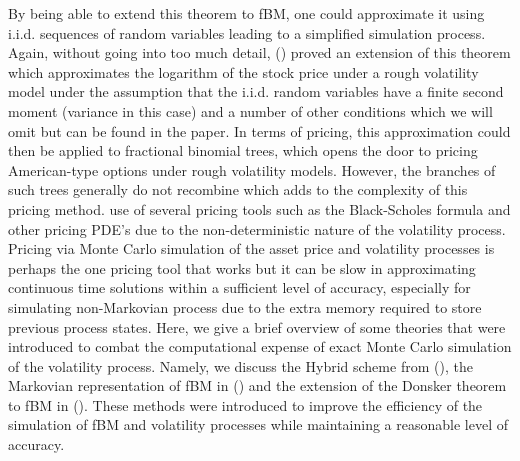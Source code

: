 \documentclass[12pt,oneside]{article}
\begin{document}
By being able to extend this theorem to fBM, one could approximate it using i.i.d. sequences of random variables leading to a simplified simulation process. Again, without going into too much detail, (\cite{HORVATH}) proved an extension of this theorem which approximates the logarithm of the stock price under a rough volatility model under the assumption that the i.i.d. random variables have a finite second moment (variance in this case) and a number of other conditions which we will omit but can be found in the paper. In terms of pricing, this approximation could then be applied to fractional binomial trees, which opens the door to pricing American-type options under rough volatility models. However, the branches of such trees generally do not recombine which adds to the complexity of this pricing method.   
use of several pricing tools such as the Black-Scholes formula and other pricing PDE's due to the non-deterministic nature of the volatility process.  Pricing via Monte Carlo simulation of the asset price and volatility processes is perhaps the one pricing tool that works but it can be slow in approximating continuous time solutions within a sufficient level of accuracy, especially for simulating non-Markovian process due to the extra memory required to store previous process states. Here, we give a brief overview of some theories that were introduced to combat the computational expense of exact Monte Carlo simulation of the volatility process. Namely, we discuss the Hybrid scheme from (\cite{BENNEDSON}), the Markovian representation of fBM in (\cite{HARMS}) and the extension of the Donsker theorem to fBM in (\cite{MUGURUZA}). These methods were introduced to improve the efficiency of the simulation of fBM and volatility processes while maintaining a reasonable level of accuracy.
\end{document}
